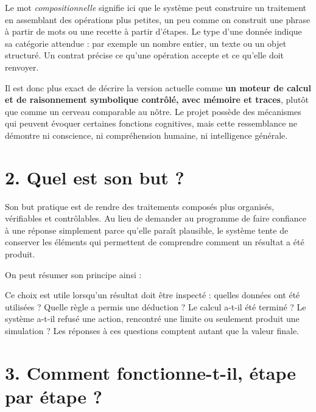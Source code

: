 \documentclass[11pt,a4paper]{article}
\newcommand{\important}[1]{\textbf{#1}}
\begin{document}
Le mot \emph{compositionnelle} signifie ici que le système peut construire un traitement en assemblant des opérations plus petites, un peu comme on construit une phrase à partir de mots ou une recette à partir d'étapes. Le type d'une donnée indique sa catégorie attendue : par exemple un nombre entier, un texte ou un objet structuré. Un contrat précise ce qu'une opération accepte et ce qu'elle doit renvoyer.

Il est donc plus exact de décrire la version actuelle comme \important{un moteur de calcul et de raisonnement symbolique contrôlé, avec mémoire et traces}, plutôt que comme un cerveau comparable au nôtre. Le projet possède des mécanismes qui peuvent évoquer certaines fonctions cognitives, mais cette ressemblance ne démontre ni conscience, ni compréhension humaine, ni intelligence générale.

\section*{2. Quel est son but ?}

Son but pratique est de rendre des traitements composés plus organisés, vérifiables et contrôlables. Au lieu de demander au programme de faire confiance à une réponse simplement parce qu'elle paraît plausible, le système tente de conserver les éléments qui permettent de comprendre comment un résultat a été produit.

On peut résumer son principe ainsi :
\begin{center}
\end{center}

Ce choix est utile lorsqu'un résultat doit être inspecté : quelles données ont été utilisées ? Quelle règle a permis une déduction ? Le calcul a-t-il été terminé ? Le système a-t-il refusé une action, rencontré une limite ou seulement produit une simulation ? Les réponses à ces questions comptent autant que la valeur finale.

\section*{3. Comment fonctionne-t-il, étape par étape ?}
\end{document}
